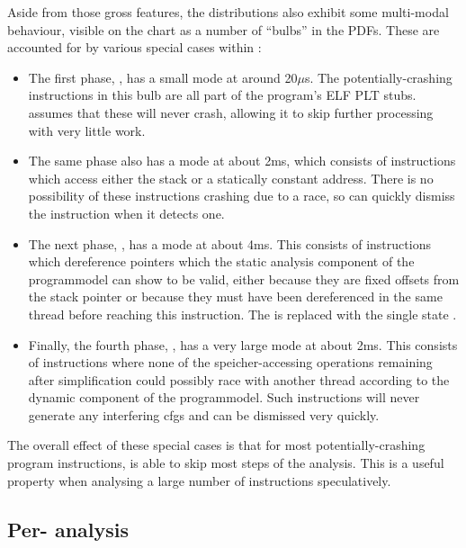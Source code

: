 Aside from those gross features, the distributions also exhibit some
multi-modal behaviour, visible on the chart as a number of ``bulbs''
in the PDFs.  These are accounted for by various special cases within
{\implementation}:
\begin{itemize}
\item The first phase, , has a small mode
  at around 20$\mu$s.  The potentially-crashing instructions in this
  bulb are all part of the program's ELF PLT stubs.  {\implementation}
  assumes that these will never crash, allowing it to skip further
  processing with very little work.
\item The same phase also has a mode at about 2ms, which consists of
  instructions which access either the stack or a statically constant
  address.  There is no possibility of these instructions crashing due
  to a race, so {\implementation} can quickly dismiss the instruction
  when it detects one.
\item The next phase, , has a mode at about 4ms.  This
  consists of instructions which dereference pointers which the static
  analysis component of the \gls{programmodel} can show to be valid,
  either because they are fixed offsets from the stack pointer or
  because they must have been dereferenced in the same thread before
  reaching this instruction.  The {\StateMachine} is replaced with the
  single state {\stSurvive}.
\item Finally, the fourth phase, , has a very large mode
  at about 2ms.  This consists of instructions where none of the
  \gls{speicher}-accessing operations remaining after {\StateMachine}
  simplification could possibly race with another thread according to
  the dynamic component of the \gls{programmodel}.  Such instructions
  will never generate any interfering \glspl{cfg} and can be dismissed
  very quickly.
\end{itemize}
The overall effect of these special cases is that for most
potentially-crashing program instructions, {\implementation} is able
to skip most steps of the analysis.  This is a useful property when
analysing a large number of instructions speculatively.

\subsection{Per- analysis}
\label{sect:eval:how:per_interfering}

